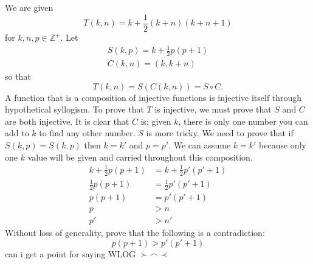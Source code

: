 \documentclass{article}
\begin{document}
\subsection{}
We are given
\begin{equation*}
    T(k,n) = k + \frac{1}{2}(k+n)(k+n+1)
\end{equation*}
for $k,n,p \in \mathbb{Z}^+$. Let
\begin{gather*}
    S(k,p) = k+\frac{1}{2}p(p+1)\\
    C(k,n) = (k,k+n)
\end{gather*}
so that
\begin{equation*}
    T(k,n) = S(C(k,n)) = S \circ C.
\end{equation*} 
A function that is a composition of injective functions is injective itself through hypothetical syllogism. To prove that $T$ is injective, we must prove that $S$ and $C$ are both injective. It is clear that $C$ is; given $k$, there is only one number you can add to $k$ to find any other number.
$S$ is more tricky. We need to prove that if $S(k,p) = S(k,p)$ then $k=k'$ and $p=p'$. We can assume $k = k'$ because only one $k$ value will be given and carried throughout this composition.
\begin{align*}
    k+\frac{1}{2}p(p+1) &= k+\frac{1}{2}p'(p'+1)\\
    \frac{1}{2}p(p+1) &= \frac{1}{2}p'(p'+1)\\
    p(p+1) &= p'(p'+1)\\
    p&>n\\
    p'&>n'
\end{align*}
Without loss of generality, prove that the following is a contradiction:
\begin{equation*}
    p(p+1) > p'(p'+1)
\end{equation*}
\footnotesize{can i get a point for saying WLOG $\succ \smallfrown \prec$}
\end{document}
